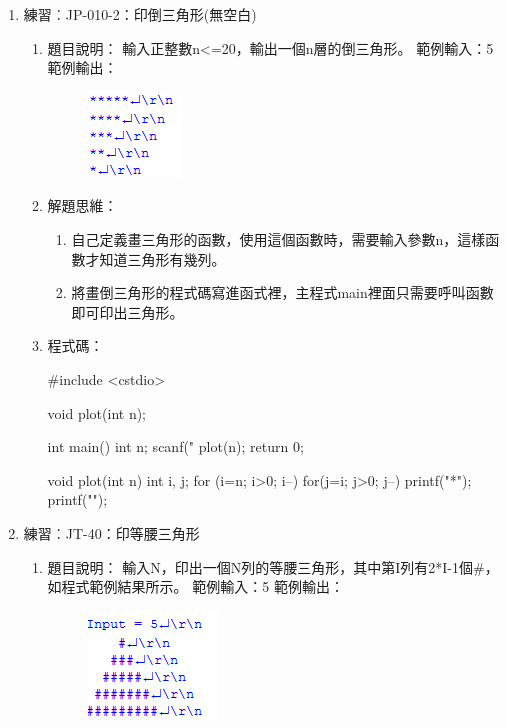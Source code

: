 \begin{enumerate}
	\item 練習︰JP-010-2：印倒三角形(無空白)
	\begin{enumerate}
		\item 題目說明：
		\subitem 輸入正整數n<=20，輸出一個n層的倒三角形。
		\subitem 範例輸入：5
		\subitem 範例輸出：
		\begin{figure}[H]
			\centering
			\includegraphics{fig/JP010fig}
		\end{figure}
		\item 解題思維：
		\begin{enumerate}
			\item 自己定義畫三角形的函數，使用這個函數時，需要輸入參數n，這樣函數才知道三角形有幾列。
			\item 將畫倒三角形的程式碼寫進函式裡，主程式main裡面只需要呼叫函數即可印出三角形。
		\end{enumerate}
		\item 程式碼：
		\begin{cppcode}
			#include <cstdio>
			
			void plot(int n);
			
			int main()
			{
				int n;
				scanf("%
				plot(n);
				return 0;
			}
			
			void plot(int n)
			{
				int i, j;
				for (i=n; i>0; i--) {
					for(j=i; j>0; j--) {
						printf("*");
					}
					printf("\n");
				}
			}		
		\end{cppcode}
	\end{enumerate}
	
	\item 練習︰JT-40：印等腰三角形
		\begin{enumerate}
			\item 題目說明：
			\subitem 輸入N，印出一個N列的等腰三角形，其中第I列有2*I-1個\#，如程式範例結果所示。
			\subitem 範例輸入：5
			\subitem 範例輸出：
			\begin{figure}[H]
				\centering
				\includegraphics{fig/JT40fig}
			\end{figure}
			

\end{enumerate}
\end{enumerate}
